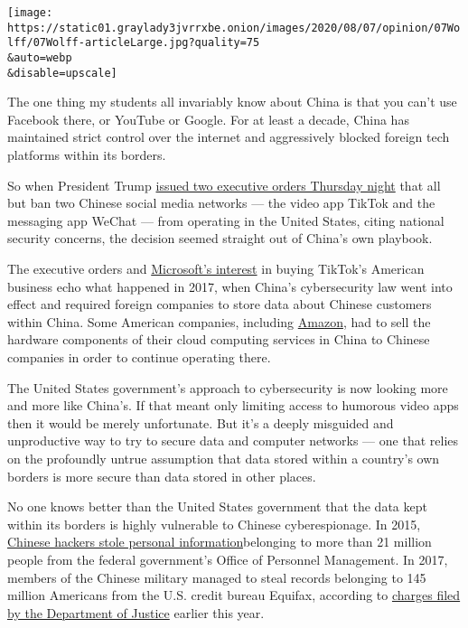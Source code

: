 \texttt{[image: https://static01.graylady3jvrrxbe.onion/images/2020/08/07/opinion/07Wolff/07Wolff-articleLarge.jpg?quality=75\\\&auto=webp\\\&disable=upscale]}

The one thing my students all invariably know about China is that you
can't use Facebook there, or YouTube or Google. For at least a decade,
China has maintained strict control over the internet and aggressively
blocked foreign tech platforms within its borders.

So when President Trump
\href{https://www.nytimes3xbfgragh.onion/2020/08/06/technology/trump-wechat-tiktok-china.html}{issued
two executive orders Thursday night} that all but ban two Chinese social
media networks --- the video app TikTok and the messaging app WeChat ---
from operating in the United States, citing national security concerns,
the decision seemed straight out of China's own playbook.

The executive orders and
\href{https://blogs.microsoft.com/blog/2020/08/02/microsoft-to-continue-discussions-on-potential-tiktok-purchase-in-the-united-states/}{Microsoft's
interest} in buying TikTok's American business echo what happened in
2017, when China's cybersecurity law went into effect and required
foreign companies to store data about Chinese customers within China.
Some American companies, including
\href{https://www.wsj.com/articles/amazon-to-sell-its-china-cloud-computing-business-1510628802}{Amazon},
had to sell the hardware components of their cloud computing services in
China to Chinese companies in order to continue operating there.

The United States government's approach to cybersecurity is now looking
more and more like China's. If that meant only limiting access to
humorous video apps then it would be merely unfortunate. But it's a
deeply misguided and unproductive way to try to secure data and computer
networks --- one that relies on the profoundly untrue assumption that
data stored within a country's own borders is more secure than data
stored in other places.

No one knows better than the United States government that the data kept
within its borders is highly vulnerable to Chinese cyberespionage. In
2015,
\href{https://www.nytimes3xbfgragh.onion/2015/07/10/us/office-of-personnel-management-hackers-got-data-of-millions.html}{Chinese
hackers stole personal information}belonging to more than 21 million
people from the federal government's Office of Personnel Management. In
2017, members of the Chinese military managed to steal records belonging
to 145 million Americans from the U.S. credit bureau Equifax, according
to
\href{https://www.justice.gov/opa/press-release/file/1246891/download}{charges
filed by the Department of Justice} earlier this year.

